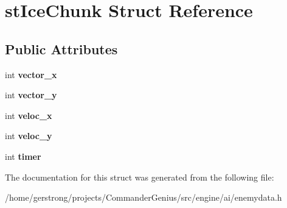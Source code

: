 \hypertarget{structst_ice_chunk}{
\section{stIceChunk Struct Reference}
\label{structst_ice_chunk}
}
\subsection*{Public Attributes}
\begin{DoxyCompactItemize}
\item 
\hypertarget{structst_ice_chunk_a770ac9425d64a17036d0931073db3c12}{
int {\bfseries vector\_\-x}}
\label{structst_ice_chunk_a770ac9425d64a17036d0931073db3c12}

\item 
\hypertarget{structst_ice_chunk_aa21244ad544bd9bc1611e1f4445d26bd}{
int {\bfseries vector\_\-y}}
\label{structst_ice_chunk_aa21244ad544bd9bc1611e1f4445d26bd}

\item 
\hypertarget{structst_ice_chunk_a599e00436042e571755e23d92c109cab}{
int {\bfseries veloc\_\-x}}
\label{structst_ice_chunk_a599e00436042e571755e23d92c109cab}

\item 
\hypertarget{structst_ice_chunk_a98c99b8cbefdda64d0511077720f13e7}{
int {\bfseries veloc\_\-y}}
\label{structst_ice_chunk_a98c99b8cbefdda64d0511077720f13e7}

\item 
\hypertarget{structst_ice_chunk_aa5e2b77563bfed754893db9344fd70f5}{
int {\bfseries timer}}
\label{structst_ice_chunk_aa5e2b77563bfed754893db9344fd70f5}

\end{DoxyCompactItemize}


The documentation for this struct was generated from the following file:\begin{DoxyCompactItemize}
\item 
/home/gerstrong/projects/CommanderGenius/src/engine/ai/enemydata.h\end{DoxyCompactItemize}
